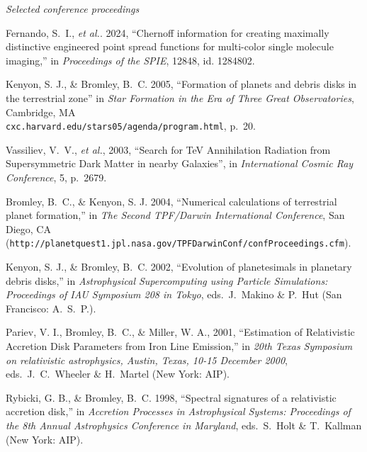 \documentclass[11pt]{article}
\begin{document}
\vspace{11pt}
\centerline{\em Selected conference proceedings}
\vspace{11pt}


Fernando, S.~I., \textit{et al.}. 2024, ``Chernoff information for creating maximally distinctive engineered point spread functions for multi-color single molecule imaging,'' in {\em Proceedings of the SPIE}, 12848, id. 1284802.

Kenyon, S. J., \& Bromley, B.~C. 2005, ``Formation of planets and
debris disks in the terrestrial zone'' in {\em Star Formation in the 
Era of Three Great Observatories}, Cambridge, MA \\ 
{\tt cxc.harvard.edu/stars05/agenda/program.html}, p.~20.

Vassiliev, V.~V., \textit{et al.}, 2003, ``Search for TeV Annihilation Radiation from Supersymmetric Dark Matter in nearby Galaxies'',
in {\em International Cosmic Ray Conference}, 5, p.~2679.

Bromley, B.~C., \& Kenyon, S. J. 2004, ``Numerical calculations of
terrestrial planet formation,'' in {\em The Second TPF/Darwin International
Conference}, San Diego, CA \\
({\tt http://planetquest1.jpl.nasa.gov/TPFDarwinConf/confProceedings.cfm}).

Kenyon, S. J., \& Bromley, B.~C. 2002, ``Evolution of planetesimals in
planetary debris disks,'' in {\em Astrophysical Supercomputing using
Particle Simulations: Proceedings of IAU Symposium 208 in Tokyo},
eds.\ J.~Makino \& P.~Hut (San Francisco: A.\ S.\ P.).

Pariev, V. I., Bromley, B.~C., \& Miller, W. A., 2001, ``Estimation of
Relativistic Accretion Disk Parameters from Iron Line Emission,'' in
{\em 20th Texas Symposium on relativistic astrophysics, Austin, Texas,
10-15 December 2000}, eds.\ J.~C.\ Wheeler \& H.~Martel (New York: AIP).


Rybicki, G. B., \& Bromley, B.~C. 1998, ``Spectral signatures of a
relativistic accretion disk,'' in {\em Accretion Processes in Astrophysical
Systems: Proceedings of the 8th Annual Astrophysics Conference in
Maryland}, eds.\ S.\ Holt \& T.\ Kallman (New York: AIP).

\end{document}
